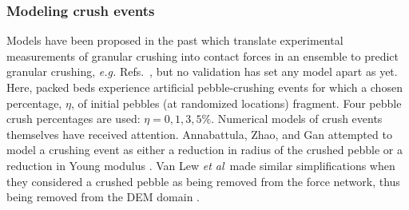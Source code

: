 \begin{table}[ht]
\centering
\caption{Transport properties of helium and boundary conditions in the CFD domain; mean values over the temperature range \SIrange{400}{900}{\celsius}.}
\label{tab:fluid-props}
\end{table}



\subsubsection{Modeling crush events}
Models have been proposed in the past which translate experimental measurements of granular crushing into contact forces in an ensemble to predict granular crushing, \textit{e.g.} Refs.~\cite{Gan:2010kc,Russell2009,Zhao2012,VanLew2015,Annabattula2014}, but no validation has set any model apart as yet. Here, packed beds experience artificial pebble-crushing events for which a chosen percentage, $\eta$, of initial pebbles (at randomized locations) fragment. Four pebble crush percentages are used: $\eta = 0, 1, 3, 5\%$. Numerical models of crush events themselves have received attention. Annabattula, Zhao, and Gan attempted to model a crushing event as either a reduction in radius of the crushed pebble or a reduction in Young modulus \cite{Annabattula2011,Zhao2013,Annabattula2012a}. Van Lew \textit{et al}~made similar simplifications when they considered a crushed pebble as being removed from the force network, thus being removed from the DEM domain \cite{VanLew2014}. 

